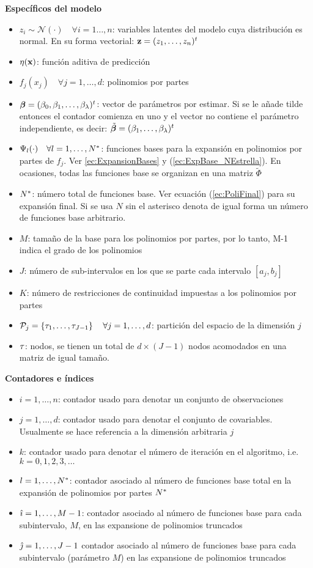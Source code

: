 \documentclass[../../Main/Main.tex]{subfiles}
\begin{document}
\textbf{Específicos del modelo}
\begin{itemize}[label={}]
	\item $z_i \sim \mathcal{N}(\cdot) \quad \forall i = 1\ldots,n$: variables latentes del modelo cuya distribución es normal. En su forma vectorial: $\mathbf{z} = (z_1,\ldots,z_n)^t$ 
	\item $\eta(\mathbf{x})$: función aditiva de predicción
	\item $f_j(x_j) \quad \forall j = 1,\ldots,d$: polinomios por partes
	\item $\bm{\beta} = (\beta_0, \beta_1,\ldots,\beta_\lambda)^t$: vector de parámetros por estimar. Si se le añade tilde entonces el contador comienza en uno y el vector no contiene el parámetro independiente, es decir: $\tilde{\bm{\beta}} = (\beta_1,\ldots,\beta_\lambda)^t$
	\item $\Psi_l(\cdot) \quad \forall l=1,\ldots,N^*$: funciones bases para la expansión en polinomios por partes de $f_j$. Ver \eqref{ec:ExpansionBases} y (\ref{ec:ExpBase_NEstrella}). En ocasiones, todas las funciones base se organizan en una matriz $\widetilde{\Phi}$
	\item $N^*$: número total de funciones base. Ver ecuación (\ref{ec:PoliFinal}) para su expansión final. Si se usa $N$ sin el asterisco denota de igual forma un número de funciones base arbitrario.
	\item $M$: tamaño de la base para los polinomios por partes, por lo tanto, M-1 indica el grado de los polinomios
	\item $J$: número de sub-intervalos en los que se parte cada intervalo $[a_j,b_j]$
	\item $K$: número de restricciones de continuidad impuestas a los polinomios por partes
	\item $\mathcal{P}_j = \left\{\tau_1,\ldots,\tau_{J-1}\right\} \quad \forall j = 1,\ldots,d$: partición del espacio de la dimensión $j$
	\item $\tau$: nodos, se tienen un total de $d\times (J-1)$ nodos acomodados en una matriz de igual tamaño.
\end{itemize}

\textbf{Contadores e índices}
\begin{itemize}[label={}]
	\item $i = 1,\ldots,n$: contador usado para denotar un conjunto de observaciones
	\item $j = 1,\ldots,d$: contador usado para denotar el conjunto de covariables. Usualmente se hace referencia a la dimensión arbitraria $j$
	\item $k$: contador usado para denotar el número de iteración en el algoritmo, i.e. $k = 0,1,2,3,\ldots$
	\item $l = 1,\ldots,N^*$: contador asociado al número de funciones base total en la expansión de polinomios por partes $N^*$
	\item $\hat{\imath} = 1,\ldots,M-1$: contador asociado al número de funciones base para cada subintervalo, $M$, en las expansione de polinomios truncados
	\item $\hat{\jmath} = 1,\ldots,J-1$ contador asociado al número de funciones base para cada subintervalo (parámetro $M$) en las expansione de polinomios truncados
\end{itemize}
	
\end{document}
